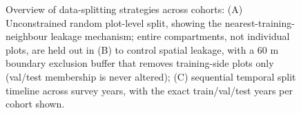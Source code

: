 \begin{figure}[!htbp]
\centering
\begin{minipage}[b]{0.32\textwidth}
  \centering
\end{minipage}\hfill
\begin{minipage}[b]{0.32\textwidth}
  \centering
\end{minipage}\hfill
\begin{minipage}[b]{0.32\textwidth}
  \centering
\end{minipage}
\caption{Overview of data-splitting strategies across cohorts: (A) Unconstrained random plot-level
split, showing the nearest-training-neighbour leakage mechanism; entire compartments, not
individual plots, are held out in (B) to control spatial leakage, with a $60\text{~m}$ boundary
exclusion buffer that removes training-side plots only (val/test membership is never altered); (C)
sequential temporal split timeline across survey years, with the exact train/val/test years per
cohort shown.}
\label{fig:splits-combined}
\end{figure}

